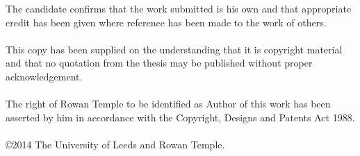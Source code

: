 
\begin{ipstatement} %

The candidate confirms that the work submitted is his own and that
appropriate credit has been given where reference has been made to
the work of others.
\\
\\
This copy has been supplied on the understanding that it is copyright
material and that no quotation from the thesis may be published
without proper acknowledgement.
\\
\\
The right of Rowan Temple to be identified as Author of this work
has been asserted by him in accordance with the Copyright, Designs
and Patents Act 1988.
\\
\\
\copyright 2014 The University of Leeds and Rowan Temple.

\end{ipstatement}


